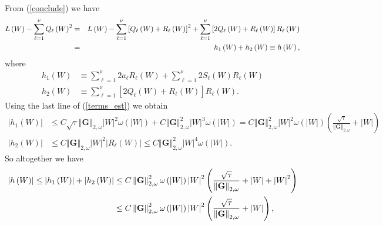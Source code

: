\documentclass{amsart}
\theoremstyle{plain}
\numberwithin{equation}{section}
\begin{document}
From (\ref{conclude}) we have%
\begin{eqnarray}
L\left( W\right) -\sum_{\ell =1}^{\nu }Q_{\ell }\left( W\right) ^{2}
&=&L\left( W\right) -\sum_{\ell =1}^{\nu }\left[ Q_{\ell }\left( W\right)
+R_{\ell }\left( W\right) \right] ^{2}+\sum_{\ell =1}^{\nu }\left[ 2Q_{\ell
}\left( W\right) +R_{\ell }\left( W\right) \right] R_{\ell }\left( W\right)
\label{conclude'} \\
&=&h_{1}\left( W\right) +h_{2}\left( W\right) \equiv h\left( W\right) , 
\notag
\end{eqnarray}%
where 
\begin{align}
h_{1}\left( W\right) & \equiv \sum_{\ell =1}^{\nu }2a_{\ell }R_{\ell }\left(
W\right) +\sum_{\ell =1}^{\nu }2S_{\ell }\left( W\right) R_{\ell }\left(
W\right)  \label{h-def} \\
h_{2}\left( W\right) & \equiv \sum_{\ell =1}^{\nu }\left[ 2Q_{\ell }\left(
W\right) +R_{\ell }\left( W\right) \right] R_{\ell }\left( W\right) .
\end{align}%
Using the last line of (\ref{terms_est}) we obtain 
\begin{align*}
\left\vert h_{1}\left( W\right) \right\vert & \leq C\sqrt{\tau }\left\Vert 
\mathbf{G}\right\Vert _{2,\omega }\left\vert W\right\vert ^{2}\omega \left(
\left\vert W\right\vert \right) +C\left\Vert \mathbf{G}\right\Vert
_{2,\omega }^{2}\left\vert W\right\vert ^{3}\omega \left( \left\vert
W\right\vert \right) =C\left\Vert \mathbf{G}\right\Vert _{2,\omega
}^{2}\left\vert W\right\vert ^{2}\omega \left( \left\vert W\right\vert
\right) \left( \frac{\sqrt{\tau }}{\left\Vert \mathbf{G}\right\Vert
_{2,\omega }}+|W|\right) \\
\left\vert h_{2}\left( W\right) \right\vert & \leq C\left\Vert \mathbf{G}%
\right\Vert _{2,\omega }\left\vert W\right\vert ^{2}\left\vert R_{\ell
}\left( W\right) \right\vert \leq C\left\Vert \mathbf{G}\right\Vert
_{2,\omega }^{2}\left\vert W\right\vert ^{4}\omega \left( \left\vert
W\right\vert \right) .
\end{align*}%
So altogether we have%
\begin{align*}
\left\vert h\left( W\right) \right\vert \leq \left\vert h_{1}\left( W\right)
\right\vert +\left\vert h_{2}\left( W\right) \right\vert & \leq C\left\Vert 
\mathbf{G}\right\Vert _{2,\omega }^{2}\omega \left( \left\vert W\right\vert
\right) \left\vert W\right\vert ^{2}\left( \frac{\sqrt{\tau }}{\left\Vert 
\mathbf{G}\right\Vert _{2,\omega }}+|W|+\left\vert W\right\vert ^{2}\right)
\\
& \leq C\left\Vert \mathbf{G}\right\Vert _{2,\omega }^{2}\omega \left(
\left\vert W\right\vert \right) \left\vert W\right\vert ^{2}\left( \frac{%
\sqrt{\tau }}{\left\Vert \mathbf{G}\right\Vert _{2,\omega }}+|W|\right) ,
\end{align*}%
\end{document}
